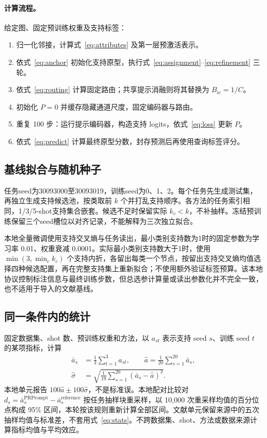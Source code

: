 \paragraph{计算流程。}
给定图、固定预训练权重及支持标签：
\begin{enumerate}
\item 归一化邻接，计算式~\eqref{eq:attributes} 及第一层预激活表示。
\item 依式~\eqref{eq:anchor} 初始化支持原型，执行式~\eqref{eq:assignment}--\eqref{eq:refinement} 三轮。
\item 依式~\eqref{eq:routing} 计算固定路由；共享提示消融则将其替换为 $B_{ic}=1/C$。
\item 初始化 $P=0$ 并缓存隐藏通道尺度，固定编码器与路由。
\item 重复 100 步：运行提示编码器，构造支持 logits，依式~\eqref{eq:loss} 更新 $P$。
\item 依式~\eqref{eq:predict} 计算最终原型分数，封存预测后再使用查询标签评分。
\end{enumerate}

\subsection{基线拟合与随机种子}
任务seed为30093000至30093019，训练seed为0、1、2。每个任务先生成测试集，再独立生成支持候选池，按类取前 $k$ 个并打乱支持顺序。各方法的任务索引相同，1/3/5-shot支持集合嵌套。候选不足时保留实际 $k_c<k$，不补抽样。冻结预训练保留三个seed槽位以对齐记录，不能解释为三次独立拟合。

本地全量微调使用支持交叉熵与任务读出，最小类别支持数为1时的固定参数为学习率 0.01、权重衰减 0.0001。实际最小类别支持数大于1时，使用 $\min(3,\min_c k_c)$ 个支持内折，各留出每类一个节点，按留出支持交叉熵均值选择四种候选配置，再在完整支持集上重新拟合；不使用额外验证标签预算。该本地协议控制标注信息与最终训练步数，但总选参计算量或读出参数化并不完全一致，也不适用于导入的文献基线。

\subsection{同一条件内的统计}
固定数据集、shot 数、预训练权重和方法，以 $a_{st}$ 表示支持 seed $s$、训练 seed $t$ 的某项指标，计算
\begin{equation}
\begin{aligned}
\bar a_s&=\frac13\sum_{t=1}^{3}a_{st},\qquad
\widehat a=\frac1{20}\sum_{s=1}^{20}\bar a_s,\\
\widehat\sigma&=\sqrt{\frac1{19}\sum_{s=1}^{20}(\bar a_s-\widehat a)^2}.
\end{aligned}
\label{eq:stats}
\end{equation}
本地单元报告 $100\widehat a\pm100\widehat\sigma$，不是标准误。本地配对比较对 $d_s=\bar a_s^{\mathrm{PRPrompt}}-\bar a_s^{\mathrm{reference}}$ 按任务抽样块重采样，以 10,000 次重采样均值的百分位点构成 95\% 区间，本轮按该规则重新计算全部区间。文献单元保留来源中的五次抽样均值与标准差，不套用式~\eqref{eq:stats}。不跨数据集、shot、方法或数据来源计算指标均值与平均效应。

